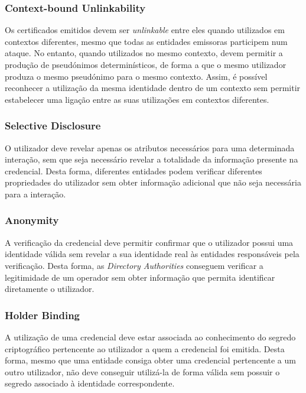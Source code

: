 \subsubsection{Context-bound Unlinkability}

Os certificados emitidos devem ser \textit{unlinkable} entre eles quando utilizados em contextos diferentes, mesmo que todas as entidades emissoras participem num ataque. No entanto, quando utilizados no mesmo contexto, devem permitir a produção de pseudónimos determinísticos, de forma a que o mesmo utilizador produza o mesmo pseudónimo para o mesmo contexto. Assim, é possível reconhecer a utilização da mesma identidade dentro de um contexto sem permitir estabelecer uma ligação entre as suas utilizações em contextos diferentes.

\subsubsection{Selective Disclosure}

O utilizador deve revelar apenas os atributos necessários para uma determinada interação, sem que seja necessário revelar a totalidade da informação presente na credencial. Desta forma, diferentes entidades podem verificar diferentes propriedades do utilizador sem obter informação adicional que não seja necessária para a interação.

\subsubsection{Anonymity}

A verificação da credencial deve permitir confirmar que o utilizador possui uma identidade válida sem revelar a sua identidade real às entidades responsáveis pela verificação. Desta forma, as \textit{Directory Authorities} conseguem verificar a legitimidade de um operador sem obter informação que permita identificar diretamente o utilizador.

\subsubsection{Holder Binding}

A utilização de uma credencial deve estar associada ao conhecimento do segredo criptográfico pertencente ao utilizador a quem a credencial foi emitida. Desta forma, mesmo que uma entidade consiga obter uma credencial pertencente a um outro utilizador, não deve conseguir utilizá-la de forma válida sem possuir o segredo associado à identidade correspondente.

